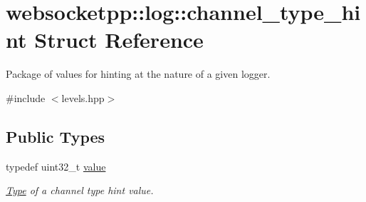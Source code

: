 \hypertarget{structwebsocketpp_1_1log_1_1channel__type__hint}{}\section{websocketpp\+:\+:log\+:\+:channel\+\_\+type\+\_\+hint Struct Reference}
\label{structwebsocketpp_1_1log_1_1channel__type__hint}


Package of values for hinting at the nature of a given logger.  




{\ttfamily \#include $<$levels.\+hpp$>$}

\subsection*{Public Types}
\begin{DoxyCompactItemize}
\item 
\mbox{\label{structwebsocketpp_1_1log_1_1channel__type__hint_ad12a7f6555b71aabdc4cbec604dc89dd}} 
typedef uint32\+\_\+t \mbox{\hyperlink{structwebsocketpp_1_1log_1_1channel__type__hint_ad12a7f6555b71aabdc4cbec604dc89dd}{value}}
\begin{DoxyCompactList}\small\item\em \mbox{\hyperlink{struct_type}{Type}} of a channel type hint value. \end{DoxyCompactList}\end{DoxyCompactItemize}
